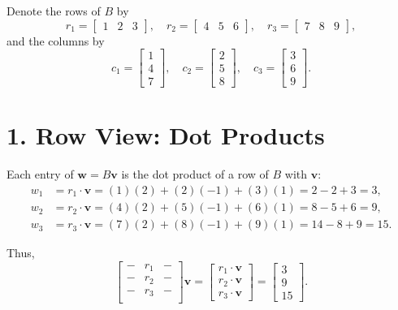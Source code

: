 Denote the rows of $B$ by
\[
r_1 = \begin{bmatrix} 1 & 2 & 3 \end{bmatrix}, \quad
r_2 = \begin{bmatrix} 4 & 5 & 6 \end{bmatrix}, \quad
r_3 = \begin{bmatrix} 7 & 8 & 9 \end{bmatrix},
\]
and the columns by
\[
c_1 = \begin{bmatrix} 1 \\ 4 \\ 7 \end{bmatrix}, \quad
c_2 = \begin{bmatrix} 2 \\ 5 \\ 8 \end{bmatrix}, \quad
c_3 = \begin{bmatrix} 3 \\ 6 \\ 9 \end{bmatrix}.
\]

\section*{1. Row View: Dot Products}

Each entry of $ \mathbf{w} = B\mathbf{v} $ is the dot product of a row of $ B $ with $ \mathbf{v} $:
\[
\begin{aligned}
w_1 &= r_1 \cdot \mathbf{v} = (1)(2) + (2)(-1) + (3)(1) = 2 - 2 + 3 = 3, \\
w_2 &= r_2 \cdot \mathbf{v} = (4)(2) + (5)(-1) + (6)(1) = 8 - 5 + 6 = 9, \\
w_3 &= r_3 \cdot \mathbf{v} = (7)(2) + (8)(-1) + (9)(1) = 14 - 8 + 9 = 15.
\end{aligned}
\]

Thus,
\[
\begin{bmatrix}
- & r_1 & - \\
- & r_2 & - \\
- & r_3 & - \\
\end{bmatrix} \mathbf{v}
=
\begin{bmatrix}
r_1 \cdot \mathbf{v} \\
r_2 \cdot \mathbf{v} \\
r_3 \cdot \mathbf{v}
\end{bmatrix}
=
\begin{bmatrix}
3 \\ 9 \\ 15
\end{bmatrix}.
\]

